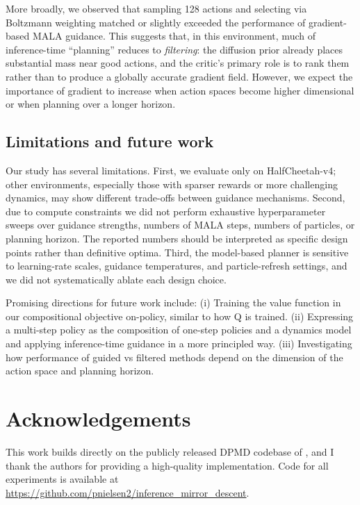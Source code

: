 \documentclass{article}
\theoremstyle{plain}
\theoremstyle{definition}
\theoremstyle{remark}
\begin{document}
More broadly, we observed that sampling 128 actions and selecting via Boltzmann weighting matched or slightly exceeded the performance of gradient-based MALA guidance.
This suggests that, in this environment, much of inference-time ``planning'' reduces to \emph{filtering}: the diffusion prior already places substantial mass near good actions, and the critic's primary role is to rank them rather than to produce a globally accurate gradient field. However, we expect the importance of gradient to increase when action spaces become higher dimensional or when planning over a longer horizon.



\subsection{Limitations and future work}

Our study has several limitations.
First, we evaluate only on HalfCheetah-v4; other environments, especially those with sparser rewards or more challenging dynamics, may show different trade-offs between guidance mechanisms.
Second, due to compute constraints we did not perform exhaustive hyperparameter sweeps over guidance strengths, numbers of MALA steps, numbers of particles, or planning horizon.
The reported numbers should be interpreted as specific design points rather than definitive optima.
Third, the model-based planner is sensitive to learning-rate scales, guidance temperatures, and particle-refresh settings, and we did not systematically ablate each design choice.

Promising directions for future work include:
(i) Training the value function in our compositional objective on-policy, similar to how Q is trained.
(ii) Expressing a multi-step policy as the composition of one-step policies and a dynamics model and applying inference-time guidance in a more principled way.
(iii) Investigating how performance of guided vs filtered methods depend on the dimension of the action space and planning horizon.


\section*{Acknowledgements}

This work builds directly on the publicly released DPMD codebase of \citet{ma2025soft}, and I thank the authors for providing a high-quality implementation.
Code for all experiments is available at \url{https://github.com/pnielsen2/inference_mirror_descent}.
\end{document}

